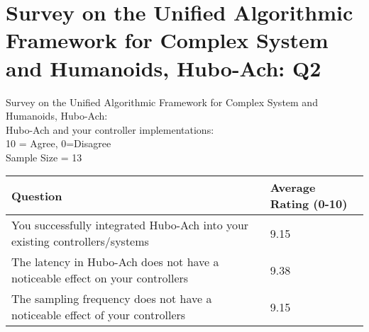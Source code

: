 \chapter{Survey on the Unified Algorithmic Framework for Complex System and Humanoids, Hubo-Ach: Q2}\label{abs:q2}
\Large
\centering
Survey on the Unified Algorithmic Framework for Complex System and Humanoids, Hubo-Ach:\\
Hubo-Ach and your controller implementations:\\
\small
10 = Agree, 0=Disagree\\
Sample Size = 13\\
\normalsize
\begin{longtable}{|p{9cm} | p{3cm} | }
\hline
Question	&	Average Rating (0-10)	\\	\hline
\hline
\hline
You successfully integrated Hubo-Ach into your existing controllers/systems							& 9.15\\
\hline
The latency in Hubo-Ach does not have a noticeable effect on your controllers 							& 9.38\\
\hline
The sampling frequency does not have a noticeable effect of your controllers							& 9.15\\
\hline


\end{longtable}

